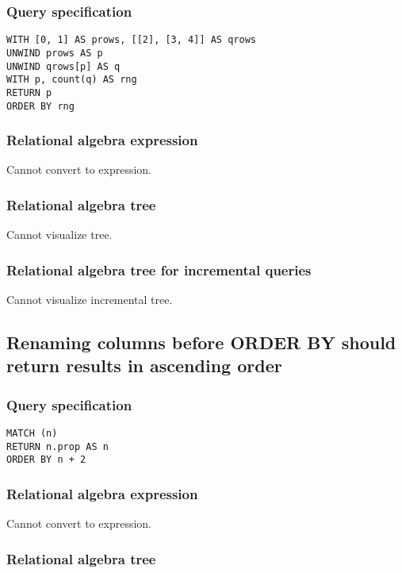 \subsubsection*{Query specification}

\begin{lstlisting}
WITH [0, 1] AS prows, [[2], [3, 4]] AS qrows
UNWIND prows AS p
UNWIND qrows[p] AS q
WITH p, count(q) AS rng
RETURN p
ORDER BY rng
\end{lstlisting}

\subsubsection*{Relational algebra expression}

Cannot convert to expression.

\subsubsection*{Relational algebra tree}

Cannot visualize tree.

\subsubsection*{Relational algebra tree for incremental queries}

Cannot visualize incremental tree.

\subsection{Renaming columns before ORDER BY should return results in ascending order}

\subsubsection*{Query specification}

\begin{lstlisting}
MATCH (n)
RETURN n.prop AS n
ORDER BY n + 2
\end{lstlisting}

\subsubsection*{Relational algebra expression}

Cannot convert to expression.

\subsubsection*{Relational algebra tree}

